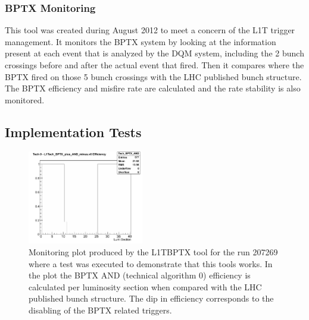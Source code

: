 \subsubsection{BPTX Monitoring}


This tool was created during August 2012 to meet a concern of the \gls{L1T} trigger management. It monitors the \gls{BPTX} system by looking at the information present at each event that 
is analyzed by the \gls{DQM} system, including the 2 bunch crossings before and after the actual event that fired. Then it 
compares where the \gls{BPTX} fired on those 5 bunch crossings with the LHC published bunch structure. The \gls{BPTX} efficiency 
and misfire rate are calculated and the rate stability is also monitored.

\subsection{Implementation Tests}


\begin{figure}[!htb]
\centering
\includegraphics[width=0.45\textwidth]{Chapter03/L1TOnline/Images/L1TBPTX_Tech_BPTX_AND.png}
\caption{Monitoring plot produced by the L1TBPTX tool for the run 207269 where a test was executed to demonstrate that 
this tools works. In the plot the BPTX AND (technical algorithm 0) efficiency is calculated per luminosity section 
when compared with the LHC published bunch structure. The dip in efficiency corresponds to the disabling of the BPTX 
related triggers.} 
\label{figure_ServiceWork_L1TBPTX}
\end{figure}

